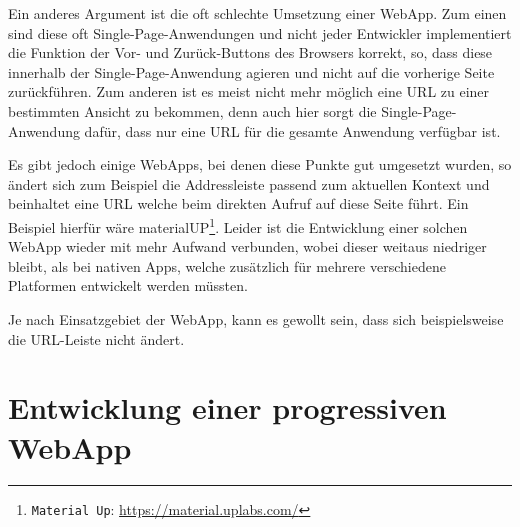 \documentclass[a4paper,12pt,ngerman,listof=numbered]{scrartcl}      %
\providecommand{\inlinecode}[1]{\texttt{#1}}
\begin{document}
	Ein anderes Argument ist die oft schlechte Umsetzung einer WebApp. Zum einen sind diese oft Single-Page-Anwendungen und nicht jeder Entwickler implementiert die Funktion der Vor- und Zurück-Buttons des Browsers korrekt, so, dass diese innerhalb der Single-Page-Anwendung agieren und nicht auf die vorherige Seite zurückführen. Zum anderen ist es meist nicht mehr möglich eine URL zu einer bestimmten Ansicht zu bekommen, denn auch hier sorgt die Single-Page-Anwendung dafür, dass nur eine URL für die gesamte Anwendung verfügbar ist.\par
	Es gibt jedoch einige WebApps, bei denen diese Punkte gut umgesetzt wurden, so ändert sich zum Beispiel die Addressleiste passend zum aktuellen Kontext und beinhaltet eine URL welche beim direkten Aufruf auf diese Seite führt. Ein Beispiel hierfür wäre materialUP\footnote{\inlinecode{Material Up}: \url{https://material.uplabs.com/}}. Leider ist die Entwicklung einer solchen WebApp wieder mit mehr Aufwand verbunden, wobei dieser weitaus niedriger bleibt, als bei nativen Apps, welche zusätzlich für mehrere verschiedene Platformen entwickelt werden müssten.\par
	Je nach Einsatzgebiet der WebApp, kann es gewollt sein, dass sich beispielsweise die URL-Leiste nicht ändert.\par

	\section{Entwicklung einer progressiven WebApp}
\end{document}
